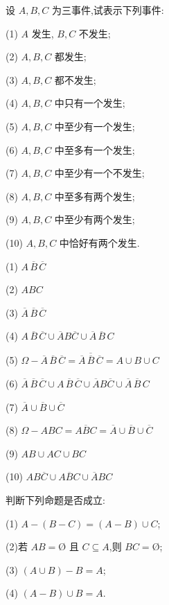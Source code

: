 \question 设 $A,B,C$ 为三事件,试表示下列事件:

(1) $A$ 发生, $B,C$ 不发生;

(2) $A,B,C$ 都发生;

(3) $A,B,C$ 都不发生;

(4) $A,B,C$ 中只有一个发生;

(5) $A,B,C$ 中至少有一个发生;

(6) $A,B,C$ 中至多有一个发生;

(7) $A,B,C$ 中至少有一个不发生;

(8) $A,B,C$ 中至多有两个发生;

(9) $A,B,C$ 中至少有两个发生;

(10) $A,B,C$ 中恰好有两个发生.

\begin{solution}
    (1) $A \, \overline{B} \, \overline{C}$

    (2) $ABC$

    (3) $\overline{A} \, \overline{B} \, \overline{C}$

    (4) $A \, \overline{B} \, \overline{C} \cup \overline{A} B \overline{C} \cup \overline{A} \, \overline{B} \, C$

    (5) $\varOmega - \overline{A} \, \overline{B} \, \overline{C} = \overline{\overline{A} \, \overline{B} \, \overline{C}} = A \cup B \cup C$

    (6) $\overline{A} \, \overline{B} \, \overline{C} \cup A \, \overline{B} \, \overline{C} \cup \overline{A} B \overline{C} \cup \overline{A} \, \overline{B} \, C$

    (7) $\overline{A} \cup \overline{B} \cup \overline{C}$

    (8) $\varOmega - ABC = \overline{ABC} = \overline{A} \cup \overline{B} \cup \overline{C}$

    (9) $AB \cup AC \cup BC$

    (10) $AB \overline{C} \cup A \overline{B} C \cup \overline{A} BC$
\end{solution}

\question 判断下列命题是否成立:

(1) $A-(B-C) = (A-B) \cup C$;

(2)若 $AB = \text{\O}$ 且 $C \subseteq A$,则 $BC = \text{\O}$;

(3) $(A \cup B) - B = A$;

(4) $(A - B) \cup B = A$.

